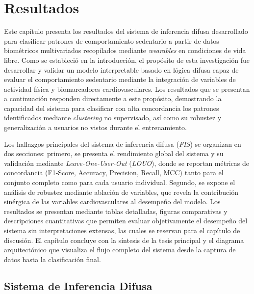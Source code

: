 \chapter{Resultados}
\label{chap:resultados}

\noindent Este capítulo presenta los resultados del sistema de inferencia difusa desarrollado para clasificar patrones de comportamiento sedentario a partir de datos biométricos multivariados recopilados mediante \textit{wearables} en condiciones de vida libre. Como se estableció en la introducción, el propósito de esta investigación fue desarrollar y validar un modelo interpretable basado en lógica difusa capaz de evaluar el comportamiento sedentario mediante la integración de variables de actividad física y biomarcadores cardiovasculares. Los resultados que se presentan a continuación responden directamente a este propósito, demostrando la capacidad del sistema para clasificar con alta concordancia los patrones identificados mediante \textit{clustering} no supervisado, así como su robustez y generalización a usuarios no vistos durante el entrenamiento.

Los hallazgos principales del sistema de inferencia difusa (\textit{FIS}) se organizan en dos secciones: primero, se presenta el rendimiento global del sistema y su validación mediante \textit{Leave-One-User-Out} (\textit{LOUO}), donde se reportan métricas de concordancia (F1-Score, Accuracy, Precision, Recall, MCC) tanto para el conjunto completo como para cada usuario individual. Segundo, se expone el análisis de robustez mediante ablación de variables, que revela la contribución sinérgica de las variables cardiovasculares al desempeño del modelo. Los resultados se presentan mediante tablas detalladas, figuras comparativas y descripciones cuantitativas que permiten evaluar objetivamente el desempeño del sistema sin interpretaciones extensas, las cuales se reservan para el capítulo de discusión. El capítulo concluye con la síntesis de la tesis principal y el diagrama arquitectónico que visualiza el flujo completo del sistema desde la captura de datos hasta la clasificación final.

\section{Sistema de Inferencia Difusa}
\label{sec:rendimiento_sistema_difuso}

